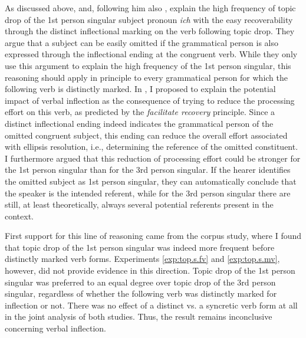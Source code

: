 As discussed above, \citet{auer1993} and, following him also \citet{imo2013, imo2014}, explain the high frequency of topic drop of the 1st person singular subject pronoun \textit{ich} with the easy recoverability  through the distinct inflectional marking on the verb following topic drop.
They argue that a subject can be easily omitted if the grammatical person is also expressed through the inflectional ending at the congruent verb.
While they only use this argument to explain the high frequency of the 1st person singular, this reasoning should apply in principle to every grammatical person for which the following verb is distinctly marked.
In , I proposed to explain the potential impact of verbal inflection as the consequence of trying to reduce the processing effort  on this verb, as predicted by the \textit{facilitate recovery} principle. 
Since a distinct inflectional ending indeed indicates the grammatical person of the omitted congruent subject, this ending can reduce the overall effort  associated with ellipsis resolution, i.e., determining the reference of the omitted constituent.
I furthermore argued that this reduction of processing effort  could be stronger for the 1st person singular than for the 3rd person singular.
If the hearer identifies the omitted subject as 1st person singular, they can  automatically conclude that the speaker is the intended referent, while for the 3rd person singular there are still, at least theoretically, always several potential referents present in the context. 

First support for this line of reasoning came from the corpus study,  where I found that topic drop of the 1st person singular was indeed more frequent before distinctly marked verb forms.
Experiments \ref*{exp:top.s.fv} and \ref*{exp:top.s.mv}, however, did not provide evidence in this direction.
Topic drop of the 1st person singular was preferred to an equal degree over topic drop of the 3rd person singular, regardless of whether the following verb was distinctly marked for inflection or not.
There was no effect of a distinct vs. a syncretic  verb form at all in the joint analysis of both studies.
Thus, the result remains inconclusive concerning verbal inflection. 


